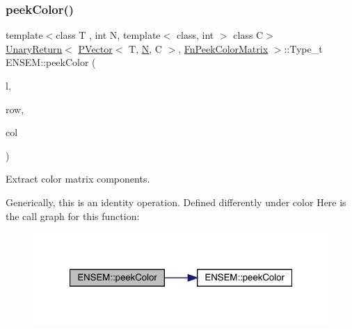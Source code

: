 \subsubsection{\texorpdfstring{peekColor()}{peekColor()}\hspace{0.1cm}{\footnotesize\ttfamily [2/2]}}
{\footnotesize\ttfamily template$<$class T , int N, template$<$ class, int $>$ class C$>$ \\
\mbox{\hyperlink{structENSEM_1_1UnaryReturn}{Unary\+Return}}$<$ \mbox{\hyperlink{classENSEM_1_1PVector}{P\+Vector}}$<$ T, \mbox{\hyperlink{operator__name__util_8cc_a7722c8ecbb62d99aee7ce68b1752f337}{N}}, C $>$, \mbox{\hyperlink{structENSEM_1_1FnPeekColorMatrix}{Fn\+Peek\+Color\+Matrix}} $>$\+::Type\+\_\+t E\+N\+S\+E\+M\+::peek\+Color (\begin{DoxyParamCaption}\item[{const \mbox{\hyperlink{classENSEM_1_1PVector}{P\+Vector}}$<$ T, \mbox{\hyperlink{operator__name__util_8cc_a7722c8ecbb62d99aee7ce68b1752f337}{N}}, C $>$ \&}]{l,  }\item[{int}]{row,  }\item[{int}]{col }\end{DoxyParamCaption})\hspace{0.3cm}{\ttfamily [inline]}}



Extract color matrix components. 

Generically, this is an identity operation. Defined differently under color Here is the call graph for this function\+:\nopagebreak
\begin{figure}[H]
\begin{center}
\leavevmode
\includegraphics[width=321pt]{d3/dc4/group__primvector_gaa5bcf955bf475e0717ffc91e91c154b9_cgraph}
\end{center}
\end{figure}
\mbox{\label{group__primvector_ga4da125100d39a8e268564ed66d48bae5}} 
